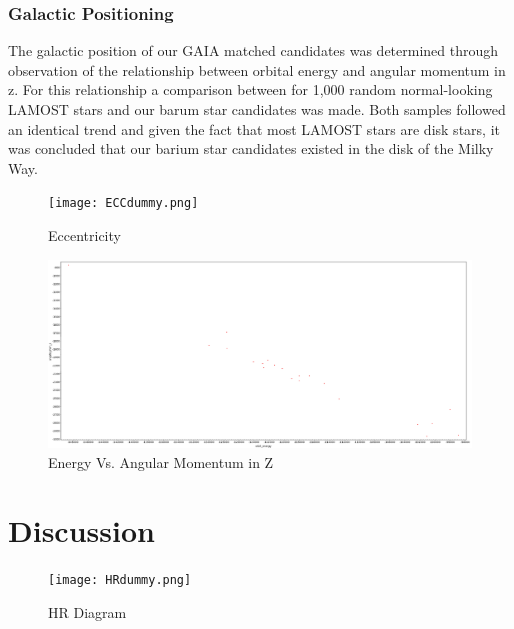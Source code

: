 \documentclass[a4paper,fleqn,usenatbib]{mnras}
\begin{document}
\subsubsection{Galactic Positioning}
The galactic position of our GAIA matched candidates was determined through observation of the relationship between orbital energy and angular momentum in z. For this relationship a comparison between for 1,000 random normal-looking LAMOST stars and our barum star candidates was made. Both samples followed an identical trend and given the fact that most LAMOST stars are disk stars, it was concluded that our barium star candidates existed in the disk of the Milky Way.

\begin{figure}
	\texttt{[image: ECCdummy.png]}
    \caption{Eccentricity}
    \label{fig:figure3}
\end{figure}

\begin{figure}
	\includegraphics[width=\columnwidth]{energy_angmomz.png}
    \caption{Energy Vs. Angular Momentum in Z}
    \label{fig:figure3}
\end{figure}

\section{Discussion}  \label{sec:dis}

\begin{figure}
	\texttt{[image: HRdummy.png]}
    \caption{HR Diagram}
    \label{fig:figure2}
\end{figure}
\end{document}
